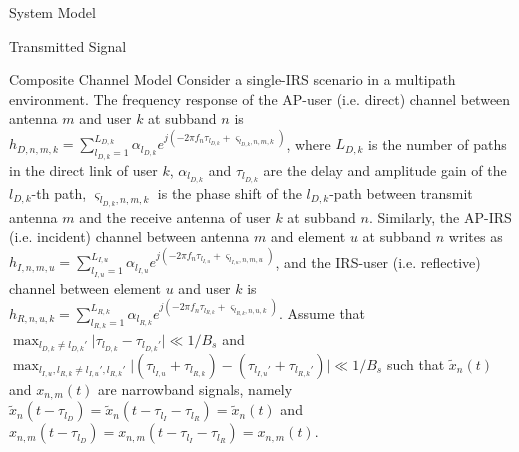 \documentclass{IEEEtran}
\begin{document}
\begin{section} {System Model}
\begin{subsection} {Transmitted Signal}
        \end{subsection}

        \begin{subsection} {Composite Channel Model}
            Consider a single-IRS scenario in a multipath environment. The frequency response of the AP-user (i.e. direct) channel between antenna $m$ and user $k$ at subband $n$ is $h_{D,n,m,k} = \sum_{l_{D,k}=1}^{L_{D,k}} \alpha_{l_{D,k}} e^{j\left( -2 \pi f_n \tau_{l_{D,k}}+\varsigma_{l_{D,k},n,m,k} \right)}$, where $L_{D,k}$ is the number of paths in the direct link of user $k$, $\alpha_{l_{D,k}}$ and $\tau_{l_{D,k}}$ are the delay and amplitude gain of the $l_{D,k}$-th path, $\varsigma_{l_{D,k},n,m,k}$ is the phase shift of the $l_{D,k}$-path between transmit antenna $m$ and the receive antenna of user $k$ at subband $n$. Similarly, the AP-IRS (i.e. incident) channel between antenna $m$ and element $u$ at subband $n$ writes as $h_{I,n,m,u} = \sum_{l_{I,u}=1}^{L_{I,u}} \alpha_{l_{I,u}} e^{j\left( -2 \pi f_n \tau_{l_{I,u}}+\varsigma_{l_{I,u},n,m,u} \right)}$, and the IRS-user (i.e. reflective) channel between element $u$ and user $k$ is $h_{R,n,u,k} = \sum_{l_{R,k}=1}^{L_{R,k}} \alpha_{l_{R,k}} e^{j\left( -2 \pi f_n \tau_{l_{R,k}}+\varsigma_{l_{R,k},n,u,k} \right)}$. Assume that $\max_{l_{D,k} \neq l_{D,k}'} \lvert \tau_{l_{D,k}}-\tau_{l_{D,k}'} \rvert \ll 1/B_s$ and $\max_{l_{I,u},l_{R,k} \neq l_{I,u}',l_{R,k}'} \lvert \left( \tau_{l_{I,u}}+\tau_{l_{R,k}} \right)-\left( \tau_{l_{I,u}'}+\tau_{l_{R,k}'} \right) \rvert \ll 1/B_s$ such that $\tilde{x}_n(t)$ and $x_{n,m}(t)$ are narrowband signals, namely $\tilde{x}_n(t-\tau_{l_D}) = \tilde{x}_n(t-\tau_{l_{I}}-\tau_{l_R}) = \tilde{x}_n(t)$ and $x_{n,m}(t-\tau_{l_D}) = x_{n,m}(t-\tau_{l_{I}}-\tau_{l_R}) = x_{n,m}(t)$.


\end{subsection}
\end{section}
\end{document}
